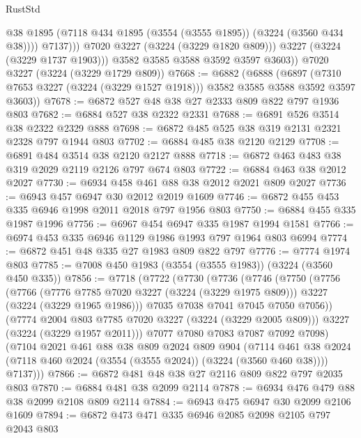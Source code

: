 \begin{lexlean}{RustStd}
\begin{coremodule}
                    @38
                    @1895
                    (@7118 @434 @1895 (@3554 (@3555 @1895)) (@3224 (@3560 @434 @38))))
                  @7137)))
            @7020
            @3227
            (@3224 (@3229 @1820 @809)))
          @3227
          (@3224 (@3229 @1737 @1903)))
        @3582
        @3585
        @3588
        @3592
        @3597
        @3603))
    @7020
    @3227
    (@3224 (@3229 @1729 @809))
@7668 := @6882
    (@6888
      (@6897 (@7310 @7653 @3227 (@3224 (@3229 @1527 @1918))) @3582 @3585 @3588 @3592 @3597 @3603))
@7678 := @6872 @527 @48 @38 @27 @2333 @809 @822 @797 @1936 @803
@7682 := @6884 @527 @38 @2322 @2331
@7688 := @6891 @526 @3514 @38 @2322 @2329 @888
@7698 := @6872 @485 @525 @38 @319 @2131 @2321 @2328 @797 @1944 @803
@7702 := @6884 @485 @38 @2120 @2129
@7708 := @6891 @484 @3514 @38 @2120 @2127 @888
@7718 := @6872 @463 @483 @38 @319 @2029 @2119 @2126 @797 @674 @803
@7722 := @6884 @463 @38 @2012 @2027
@7730 := @6934 @458 @461 @88 @38 @2012 @2021 @809 @2027
@7736 := @6943 @457 @6947 @30 @2012 @2019 @1609
@7746 := @6872 @455 @453 @335 @6946 @1998 @2011 @2018 @797 @1956 @803
@7750 := @6884 @455 @335 @1987 @1996
@7756 := @6967 @454 @6947 @335 @1987 @1994 @1581
@7766 := @6974 @453 @335 @6946 @1129 @1986 @1993 @797 @1964 @803 @6994
@7774 := @6872 @451 @48 @335 @27 @1983 @809 @822 @797
@7776 := @7774 @1974 @803
@7785 := @7008 @450 @1983 (@3554 (@3555 @1983)) (@3224 (@3560 @450 @335))
@7856 := @7718
    (@7722
      (@7730
        (@7736
          (@7746
            (@7750
              (@7756
                (@7766
                  (@7776 @7785 @7020 @3227 (@3224 (@3229 @1975 @809)))
                  @3227
                  (@3224 (@3229 @1965 @1986)))
                @7035
                @7038
                @7041
                @7045
                @7050
                @7056))
            (@7774 @2004 @803 @7785 @7020 @3227 (@3224 (@3229 @2005 @809)))
            @3227
            (@3224 (@3229 @1957 @2011)))
          @7077
          @7080
          @7083
          @7087
          @7092
          @7098)
        (@7104
          @2021
          @461
          @88
          @38
          @809
          @2024
          @809
          @904
          (@7114 @461 @38 @2024 (@7118 @460 @2024 (@3554 (@3555 @2024)) (@3224 (@3560 @460 @38))))
          @7137)))
@7866 := @6872 @481 @48 @38 @27 @2116 @809 @822 @797 @2035 @803
@7870 := @6884 @481 @38 @2099 @2114
@7878 := @6934 @476 @479 @88 @38 @2099 @2108 @809 @2114
@7884 := @6943 @475 @6947 @30 @2099 @2106 @1609
@7894 := @6872 @473 @471 @335 @6946 @2085 @2098 @2105 @797 @2043 @803

\end{coremodule}
\end{lexlean}
